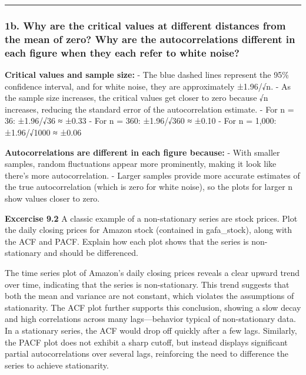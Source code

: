\documentclass[
]{article}
\begin{document}
\begin{center}\rule{0.5\linewidth}{0.5pt}\end{center}

\hypertarget{b.-why-are-the-critical-values-at-different-distances-from-the-mean-of-zero-why-are-the-autocorrelations-different-in-each-figure-when-they-each-refer-to-white-noise}{%
\subsubsection{\texorpdfstring{\textbf{1b. Why are the critical values
at different distances from the mean of zero? Why are the
autocorrelations different in each figure when they each refer to white
noise?}}{1b. Why are the critical values at different distances from the mean of zero? Why are the autocorrelations different in each figure when they each refer to white noise?}}\label{b.-why-are-the-critical-values-at-different-distances-from-the-mean-of-zero-why-are-the-autocorrelations-different-in-each-figure-when-they-each-refer-to-white-noise}}

\textbf{Critical values and sample size:} - The blue dashed lines
represent the 95\% confidence interval, and for white noise, they are
approximately ±1.96/√n. - As the sample size increases, the critical
values get closer to zero because √n increases, reducing the standard
error of the autocorrelation estimate. - For n = 36: ±1.96/√36 ≈ ±0.33 -
For n = 360: ±1.96/√360 ≈ ±0.10 - For n = 1,000: ±1.96/√1000 ≈ ±0.06

\textbf{Autocorrelations are different in each figure because:} - With
smaller samples, random fluctuations appear more prominently, making it
look like there's more autocorrelation. - Larger samples provide more
accurate estimates of the true autocorrelation (which is zero for white
noise), so the plots for larger n show values closer to zero.

\textbf{Excercise 9.2} A classic example of a non-stationary series are
stock prices. Plot the daily closing prices for Amazon stock (contained
in gafa\_stock), along with the ACF and PACF. Explain how each plot
shows that the series is non-stationary and should be differenced.

The time series plot of Amazon's daily closing prices reveals a clear
upward trend over time, indicating that the series is non-stationary.
This trend suggests that both the mean and variance are not constant,
which violates the assumptions of stationarity. The ACF plot further
supports this conclusion, showing a slow decay and high correlations
across many lags---behavior typical of non-stationary data. In a
stationary series, the ACF would drop off quickly after a few lags.
Similarly, the PACF plot does not exhibit a sharp cutoff, but instead
displays significant partial autocorrelations over several lags,
reinforcing the need to difference the series to achieve stationarity.
\end{document}
